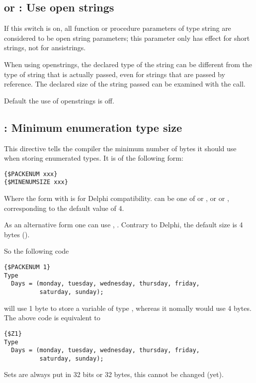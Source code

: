 \subsection{ or  : Use open strings}

If this switch is on, all function or procedure parameters of type string
are considered to be open string parameters; this parameter only has effect
for short strings, not for ansistrings.

When using openstrings, the declared type of the string can be different
from the type of string that is actually passed, even for strings that are
passed by reference. The declared size of the string passed can be examined
with the  call.

Default the use of openstrings is off.

\subsection{ : Minimum enumeration type size}

This directive tells the compiler the minimum number of bytes it should
use when storing enumerated types. It is of the following form:
\begin{verbatim}
{$PACKENUM xxx}
{$MINENUMSIZE xxx}
\end{verbatim}
Where the form with  is for Delphi compatibility.
 can be one of  or , or  or
, corresponding to the default value of 4.

As an alternative form one can use , 
. Contrary to Delphi, the default size is 4 bytes
().

So the following code
\begin{verbatim}
{$PACKENUM 1}
Type
  Days = (monday, tuesday, wednesday, thursday, friday,
          saturday, sunday);
\end{verbatim}
will use 1 byte to store a variable of type , whereas it nomally
would use 4 bytes. The above code is equivalent to
\begin{verbatim}
{$Z1}
Type
  Days = (monday, tuesday, wednesday, thursday, friday,
          saturday, sunday);
\end{verbatim}

\begin{remark}Sets are always put in 32 bits or 32 bytes, this cannot be changed (yet).
\end{remark}

